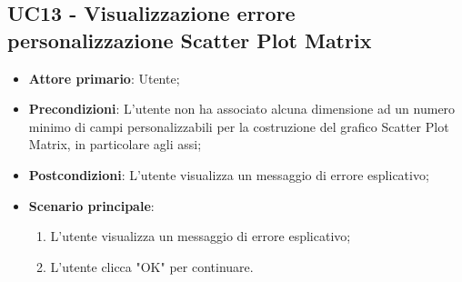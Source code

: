 \subsection{UC13 - Visualizzazione errore personalizzazione Scatter Plot Matrix}
\begin{itemize}
	\item \textbf{Attore primario}: Utente;
	\item \textbf{Precondizioni}: L'utente non ha associato alcuna dimensione ad un numero minimo di campi personalizzabili per la costruzione del grafico Scatter Plot Matrix, in particolare agli assi;
	\item \textbf{Postcondizioni}: L'utente visualizza un messaggio di errore esplicativo;
	\item \textbf{Scenario principale}:
		\begin{enumerate}
			\item L'utente visualizza un messaggio di errore esplicativo;
			\item L'utente clicca "OK" per continuare.
		\end{enumerate}
\end{itemize}